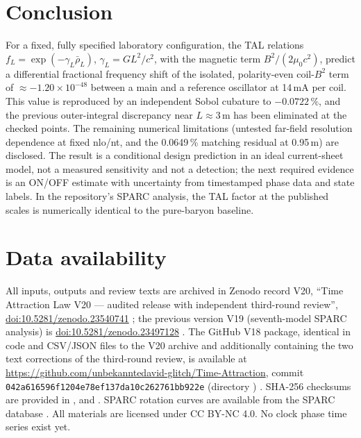 \documentclass[12pt,a4paper]{article}
\newcommand{\rhob}{\bar\rho_L}
\begin{document}
\section{Conclusion}\label{sec:conclusion}
For a fixed, fully specified laboratory configuration, the TAL relations $f_L=\exp(-\gamma_L\rhob)$,
$\gamma_L=GL^2/c^2$, with the magnetic term $B^2/(2\mu_0c^2)$, predict a differential fractional frequency shift of the
isolated, polarity-even coil-$B^2$ term of $\approx-1.20\times10^{-48}$ between a main and a reference oscillator at
14\,mA per coil. This value is reproduced by an independent Sobol cubature to $-0.0722\,\%$, and the previous outer-integral
discrepancy near $L\approx3$\,m has been eliminated at the checked points. The remaining numerical limitations (untested
far-field resolution dependence at fixed nlo/nt, and the 0.0649\,\% matching residual at 0.95\,m) are disclosed. The
result is a conditional design prediction in an ideal current-sheet model, not a measured sensitivity and not a
detection; the next required evidence is an ON/OFF estimate with uncertainty from timestamped phase data and state labels.
In the repository's SPARC analysis, the TAL factor at the published scales is numerically identical to the pure-baryon
baseline.

\section*{Data availability}
All inputs, outputs and review texts are archived in Zenodo record V20,
``Time Attraction Law V20 --- audited release with independent third-round review'',
\href{https://doi.org/10.5281/zenodo.23540741}{doi:10.5281/zenodo.23540741} \cite{TAL_V20}; the previous version V19
(seventh-model SPARC analysis) is \href{https://doi.org/10.5281/zenodo.23497128}{doi:10.5281/zenodo.23497128} \cite{TAL_V19}.
The GitHub V18 package, identical in code and CSV/JSON files to the V20 archive and additionally containing the two
text corrections of the third-round review, is available at
\url{https://github.com/unbekanntedavid-glitch/Time-Attraction}, commit
\texttt{042a616596f1204e78ef137da10c262761bb922e} (directory ) \cite{TAL_repo}. SHA-256 checksums are provided
in ,  and . SPARC
rotation curves are available from the SPARC database \cite{Lelli2016}. All materials are licensed under CC BY-NC 4.0.
No clock phase time series exist yet.
\end{document}

